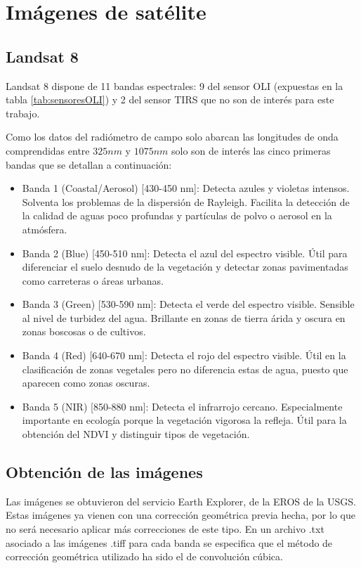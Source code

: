 \section{Imágenes de satélite}
\subsection{Landsat 8}
Landsat 8 dispone de 11 bandas espectrales: 9 del sensor \ac{OLI} (expuestas en la tabla \ref{tab:sensoresOLI}) y 2 del sensor \ac{TIRS} que no son de interés para este trabajo.\Sep

Como los datos del radiómetro de campo solo abarcan las longitudes de onda comprendidas entre $325 nm$ y $1075 nm$ solo son de interés las cinco primeras bandas que se detallan a continuación:

\begin{itemize}
	\item Banda 1 (Coastal/Aerosol) [430-450 nm]: Detecta azules y violetas intensos. Solventa los problemas de la dispersión de Rayleigh. Facilita la detección de la calidad de aguas poco profundas y partículas de polvo o aerosol en la atmósfera.
	\item Banda 2 (Blue) [450-510 nm]: Detecta el azul del espectro visible. Útil para diferenciar el suelo desnudo de la vegetación y detectar zonas pavimentadas como carreteras o áreas urbanas.
	\item Banda 3 (Green) [530-590 nm]: Detecta el verde del espectro visible. Sensible al nivel de turbidez del agua. Brillante en zonas de tierra árida y oscura en zonas boscosas o de cultivos.
	\item Banda 4 (Red) [640-670 nm]: Detecta el rojo del espectro visible. Útil en la clasificación de zonas vegetales pero no diferencia estas de agua, puesto que aparecen como zonas oscuras.
	\item Banda 5 (NIR) [850-880 nm]: Detecta el infrarrojo cercano. Especialmente importante en ecología porque la vegetación vigorosa la refleja. Útil para la obtención del \ac{NDVI} y distinguir tipos de vegetación.
\end{itemize}


\subsection{Obtención de las imágenes}
Las imágenes se obtuvieron del servicio Earth Explorer, de la \ac{EROS} de la \ac{USGS}. Estas imágenes ya vienen con una corrección geométrica previa hecha, por lo que no será necesario aplicar más correcciones de este tipo. En un archivo .txt asociado a las imágenes .tiff para cada banda se especifica que el método de corrección geométrica utilizado ha sido el de convolución cúbica.\Sep

